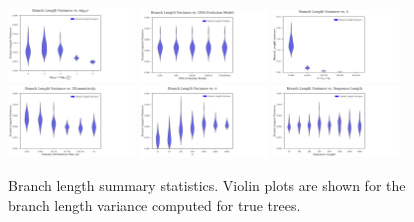 \begin{figure} %
\centering
\includegraphics[width=0.3\textwidth]{figs/dualbirth-tree-bl-supp-a}
\includegraphics[width=0.3\textwidth]{figs/dualbirth-tree-bl-supp-b}
\includegraphics[width=0.3\textwidth]{figs/dualbirth-tree-bl-supp-c}\\
\includegraphics[width=0.3\textwidth]{figs/dualbirth-tree-bl-supp-d}
\includegraphics[width=0.3\textwidth]{figs/dualbirth-tree-bl-supp-e}
\includegraphics[width=0.3\textwidth]{figs/dualbirth-tree-bl-supp-f}
\caption[Branch Length Summary Statistics]
{Branch length summary statistics. Violin plots are shown for the branch length variance computed for true trees.}
\label{fig:dualbirth-tree-bl-supp}
\end{figure}

